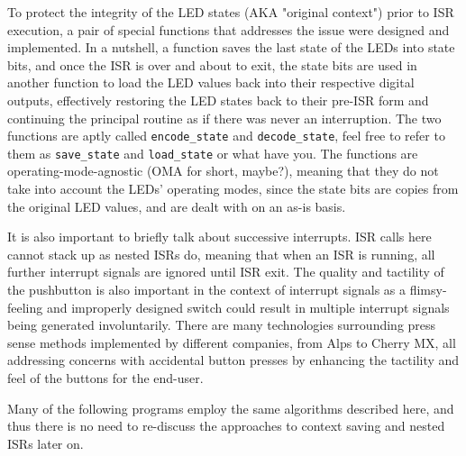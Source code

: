 \documentclass{article}
\begin{document}
To protect the integrity of the LED states (AKA "original context") prior to ISR execution, a pair of special functions that addresses the issue were designed and implemented. In a nutshell, a function saves the last state of the LEDs into state bits, and once the ISR is over and about to exit, the state bits are used in another function to load the LED values back into their respective digital outputs, effectively restoring the LED states back to their pre-ISR form and continuing the principal routine as if there was never an interruption. The two functions are aptly called \texttt{encode\_state} and \texttt{decode\_state}, feel free to refer to them as \texttt{save\_state} and \texttt{load\_state} or what have you. The functions are operating-mode-agnostic (OMA for short, maybe?), meaning that they do not take into account the LEDs' operating modes, since the state bits are copies from the original LED values, and are dealt with on an as-is basis.

It is also important to briefly talk about successive interrupts. ISR calls here cannot stack up as nested ISRs do, meaning that when an ISR is running, all further interrupt signals are ignored until ISR exit. The quality and tactility of the pushbutton is also important in the context of interrupt signals as a  flimsy-feeling and improperly designed switch could result in multiple interrupt signals being generated involuntarily. There are many technologies surrounding press sense methods implemented by different companies, from Alps to Cherry MX, all addressing concerns with accidental button presses by enhancing the tactility and feel of the buttons for the end-user.

Many of the following programs employ the same algorithms described here, and thus there is no need to re-discuss the approaches to context saving and nested ISRs later on.\pagebreak
\end{document}
